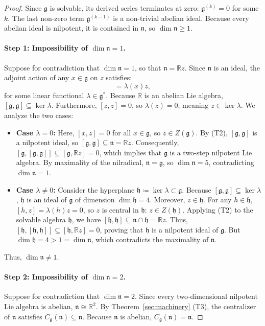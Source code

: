\documentclass[11pt,a4paper]{article}
\theoremstyle{definition}
\theoremstyle{remark}
\newcommand{\R}{\mathbb{R}}
\newcommand{\g}{\mathfrak{g}}
\newcommand{\n}{\mathfrak{n}}
\newcommand{\hh}{\mathfrak{h}}
\begin{document}
\begin{proof}
Since $\g$ is solvable, its derived series terminates at zero: $\g^{(k)} = 0$ for some $k$. The last non-zero term $\g^{(k-1)}$ is a non-trivial abelian ideal. Because every abelian ideal is nilpotent, it is contained in $\n$, so $\dim \n \ge 1$.

\paragraph{Step 1: Impossibility of $\dim \n = 1$.}
Suppose for contradiction that $\dim \n = 1$, so that $\n = \R z$. Since $\n$ is an ideal, the adjoint action of any $x \in \g$ on $z$ satisfies:
\begin{equation}
    [x, z] = \lambda(x) z,
\end{equation}
for some linear functional $\lambda \in \g^*$. Because $\R$ is an abelian Lie algebra, $[\g, \g] \subseteq \ker \lambda$. Furthermore, $[z, z] = 0$, so $\lambda(z) = 0$, meaning $z \in \ker \lambda$. We analyze the two cases:
\begin{itemize}
    \item \textbf{Case $\lambda = 0$:} Here, $[x, z] = 0$ for all $x \in \g$, so $z \in Z(\g)$. By (T2), $[\g, \g]$ is a nilpotent ideal, so $[\g, \g] \subseteq \n = \R z$. Consequently, $[\g, [\g, \g]] \subseteq [\g, \R z] = 0$, which implies that $\g$ is a two-step nilpotent Lie algebra. By maximality of the nilradical, $\n = \g$, so $\dim \n = 5$, contradicting $\dim \n = 1$.
    \item \textbf{Case $\lambda \neq 0$:} Consider the hyperplane $\hh \coloneqq \ker \lambda \subset \g$. Because $[\g, \g] \subseteq \ker \lambda$, $\hh$ is an ideal of $\g$ of dimension $\dim \hh = 4$. Moreover, $z \in \hh$. For any $h \in \hh$, $[h, z] = \lambda(h)z = 0$, so $z$ is central in $\hh$: $z \in Z(\hh)$. Applying (T2) to the solvable algebra $\hh$, we have $[\hh, \hh] \subseteq \n \cap \hh = \R z$. Thus, $[\hh, [\hh, \hh]] \subseteq [\hh, \R z] = 0$, proving that $\hh$ is a nilpotent ideal of $\g$. But $\dim \hh = 4 > 1 = \dim \n$, which contradicts the maximality of $\n$.
\end{itemize}
Thus, $\dim \n \neq 1$.

\paragraph{Step 2: Impossibility of $\dim \n = 2$.}
Suppose for contradiction that $\dim \n = 2$. Since every two-dimensional nilpotent Lie algebra is abelian, $\n \cong \R^2$. By Theorem~\ref{sec:machinery} (T3), the centralizer of $\n$ satisfies $C_\g(\n) \subseteq \n$. Because $\n$ is abelian, $C_\g(\n) = \n$. 


\end{proof}
\end{document}
